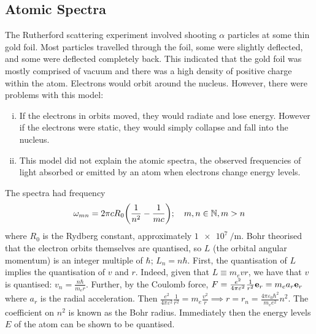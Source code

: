 \subsection{Atomic Spectra}
The Rutherford scattering experiment involved shooting \( \alpha \) particles at some thin gold foil.
Most particles travelled through the foil, some were slightly deflected, and some were deflected completely back.
This indicated that the gold foil was mostly comprised of vacuum and there was a high density of positive charge within the atom.
Electrons would orbit around the nucleus.
However, there were problems with this model:
\begin{enumerate}[(i)]
\item If the electrons in orbits moved, they would radiate and lose energy.
However if the electrons were static, they would simply collapse and fall into the nucleus.
\item This model did not explain the atomic spectra, the observed frequencies of light absorbed or emitted by an atom when electrons change energy levels.
\end{enumerate}
The spectra had frequency
\[ \omega_{mn} = 2 \pi c R_0 \qty(\frac{1}{n^2} - \frac{1}{mc}); \quad m, n \in \mathbb N, m > n \]
where \( R_0 \) is the Rydberg constant, approximately \( \SI{1e7}{\per\metre} \).
Bohr theorised that the electron orbits themselves are quantised, so \( L \) (the orbital angular momentum) is an integer multiple of \( \hbar \); \( L_n = n \hbar \).
First, the quantisation of \( L \) implies the quantisation of \( v \) and \( r \).
Indeed, given that \( L \equiv m_e v r \), we have that \( v \) is quantised: \( v_n = \frac{n\hbar}{m_e r} \).
Further, by the Coulomb force, \( F = \frac{e^2}{4 \pi \varepsilon^2} \frac{1}{r^2} \vb e_r = m_e a_r \vb e_r \) where \( a_r \) is the radial acceleration.
Then \( \frac{e^2}{4 \pi \varepsilon^2} \frac{1}{r^2} = m_e \frac{v^2}{r} \implies r = r_n = \frac{4 \pi \varepsilon_0 \hbar^2}{m_e e^2} n^2 \).
The coefficient on \( n^2 \) is known as the Bohr radius.
Immediately then the energy levels \( E \) of the atom can be shown to be quantised.
